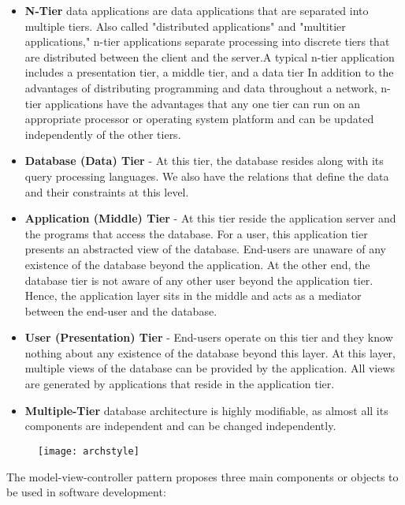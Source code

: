 \documentclass[12pt, oneside]{book}   	%
\begin{document}
\begin{itemize}
\item \textbf{N-Tier} data applications are data applications that are separated into multiple tiers. Also called "distributed applications" and "multitier applications," 
n-tier applications separate processing into discrete tiers that are distributed between the client and the server.A typical n-tier application includes a presentation tier, a middle tier, and a data tier
In addition to the advantages of distributing programming and data throughout a network, n-tier applications have the advantages that any one tier can run on an appropriate processor or operating system platform and can be updated independently of the other tiers.

\item \textbf{Database (Data) Tier} - At this tier, the database resides along with its query processing languages. We also have the relations that define the data and their constraints at this level.

\item \textbf{Application (Middle) Tier} - At this tier reside the application server and the programs that access the database. For a user, this application tier presents an abstracted view of the database. End-users are unaware of any existence of the database beyond the application. At the other end, the database tier is not aware of any other user beyond the application tier. Hence, the application layer sits in the middle and acts as a mediator between the end-user and the database.

\item \textbf{User (Presentation) Tier} - End-users operate on this tier and they know nothing about any existence of the database beyond this layer. At this layer, multiple views of the database can be provided by the application. All views are generated by applications that reside in the application tier.

\item \textbf{Multiple-Tier} database architecture is highly modifiable, as almost all its components are independent and can be changed independently.
\end{itemize}
\begin{figure}[h]
\center \texttt{[image: archstyle]}
\end{figure}
\clearpage
The model-view-controller pattern proposes three main components or objects to be used in software development:
\vspace{2cm}
\end{document}
